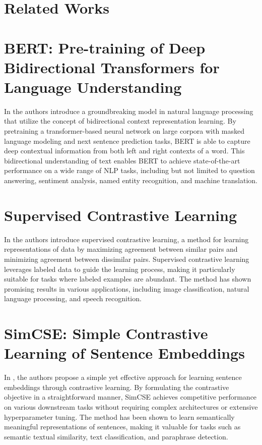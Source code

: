 \section*{Related Works}

\section*{BERT: Pre-training of Deep Bidirectional Transformers for Language Understanding}
In \cite{bert} the authors introduce a groundbreaking model in natural language processing that utilize the concept of bidirectional context representation learning. By pretraining a transformer-based neural network on large corpora with masked language modeling and next sentence prediction tasks, BERT is able to capture deep contextual information from both left and right contexts of a word. This bidirectional understanding of text enables BERT to achieve state-of-the-art performance on a wide range of NLP tasks, including but not limited to question answering, sentiment analysis, named entity recognition, and machine translation.

\section*{Supervised Contrastive Learning}
In \cite{scl} the authors introduce supervised contrastive learning, a method for learning representations of data by maximizing agreement between similar pairs and minimizing agreement between dissimilar pairs. Supervised contrastive learning leverages labeled data to guide the learning process, making it particularly suitable for tasks where labeled examples are abundant. The method has shown promising results in various applications, including image classification, natural language processing, and speech recognition.

\section*{SimCSE: Simple Contrastive Learning of Sentence Embeddings}
In \cite{simcse}, the authors propose a simple yet effective approach for learning sentence embeddings through contrastive learning. By formulating the contrastive objective in a straightforward manner, SimCSE achieves competitive performance on various downstream tasks without requiring complex architectures or extensive hyperparameter tuning. The method has been shown to learn semantically meaningful representations of sentences, making it valuable for tasks such as semantic textual similarity, text classification, and paraphrase detection.
